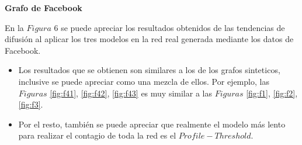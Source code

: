 \documentclass{article}
\begin{document}
\textbf{Grafo de Facebook}


En la $Figura$ $6$ se puede apreciar los resultados obtenidos de las tendencias de difusión al aplicar los tres modelos en la red real generada mediante los datos de Facebook. 

\begin{itemize}
	\item Los resultados que se obtienen son similares a los de los grafos sinteticos, inclusive se puede apreciar como una mezcla de ellos. Por ejemplo, las $Figuras $ \ref{fig:f41}, \ref{fig:f42}, \ref{fig:f43} es muy similar a las $Figuras $ \ref{fig:f1}, \ref{fig:f2}, \ref{fig:f3}. 
	\item Por el resto, también se puede apreciar que realmente el modelo más lento para realizar el contagio de toda la red es el $Profile-Threshold$.
\end{itemize}
\end{document}
